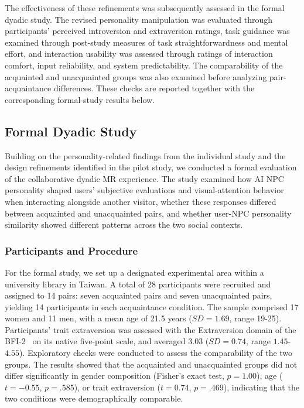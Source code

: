 \documentclass[a4paper,fleqn]{cas-sc}
\begin{document}
The effectiveness of these refinements was subsequently assessed in the formal dyadic study. The revised personality manipulation was evaluated through participants' perceived introversion and extraversion ratings, task guidance was examined through post-study measures of task straightforwardness and mental effort, and interaction usability was assessed through ratings of interaction comfort, input reliability, and system predictability. The comparability of the acquainted and unacquainted groups was also examined before analyzing pair-acquaintance differences. These checks are reported together with the corresponding formal-study results below.

\subsection{Formal Dyadic Study}

Building on the personality-related findings from the individual study and the design refinements identified in the pilot study, we conducted a formal evaluation of the collaborative dyadic MR experience. The study examined how AI NPC personality shaped users' subjective evaluations and visual-attention behavior when interacting alongside another visitor, whether these responses differed between acquainted and unacquainted pairs, and whether user-NPC personality similarity showed different patterns across the two social contexts.

\subsubsection{Participants and Procedure}
For the formal study, we set up a designated experimental area within a university library in Taiwan. A total of 28 participants were recruited and assigned to 14 pairs: seven acquainted pairs and seven unacquainted pairs, yielding 14 participants in each acquaintance condition. The sample comprised 17 women and 11 men, with a mean age of 21.5 years ($SD = 1.69$, range 19-25). Participants' trait extraversion was assessed with the Extraversion domain of the BFI-2~\citep{sotoNextBigFive2017} on its native five-point scale, and averaged $3.03$ ($SD = 0.74$, range $1.45$-$4.55$). Exploratory checks were conducted to assess the comparability of the two groups. The results showed that the acquainted and unacquainted groups did not differ significantly in gender composition (Fisher's exact test, $p = 1.00$), age ($t = -0.55$, $p = .585$), or trait extraversion ($t = 0.74$, $p = .469$), indicating that the two conditions were demographically comparable.
\end{document}

